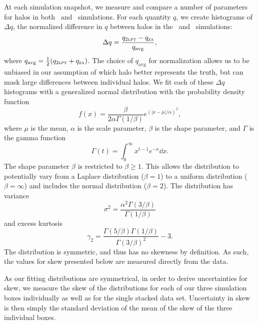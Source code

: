 At each simulation snapshot, we measure and compare a number of parameters for halos in both \lpt\ and \za\ simulations.  For each quantity $q$, we create histograms of $\Delta q$, the normalized difference in $q$ between halos in the \lpt\ and \za\ simulations:
\begin{equation} \label{eq:delta_q}
	\Delta q = \frac{q_{\textsc{2lpt}} - q_{\textsc{za}}}{q_{\mathrm{avg}}},
\end{equation}
where $q_{\mathrm{avg}} = \frac{1}{2} (q_{\textsc{2lpt}} + q_{\textsc{za}})$.  The choice of $q_{\mathrm{avg}}$ for normalization allows us to be unbiased in our assumption of which halo better represents the truth, but can mask large differences between individual halos.  We fit each of these $\Delta q$ histograms with a generalized normal distribution \citep{doi:10.1080/02664760500079464} with the probability density function
\begin{equation} \label{eq:generalized_normal}
	f(x) = \frac{ \beta }{2 \alpha \Gamma(1 / \beta)} e^{\left( \left| x - \mu \right| / \alpha \right)^{\beta}},
\end{equation}
where $\mu$ is the mean, $\alpha$ is the scale parameter, $\beta$ is the shape parameter, and $\Gamma$ is the gamma function
\begin{equation} \label{eq:gamma_function}
	\Gamma(t) = \int_{0}^{\infty} x^{t-1} e^{-x} \dd x.
\end{equation}
The shape parameter $\beta$ is restricted to $\beta \geq 1$.  This allows the distribution to potentially vary from a Laplace distribution ($\beta = 1$) to a uniform distribution ($\beta = \infty$) and includes the normal distribution ($\beta = 2$).  The distribution has variance
\begin{equation} \label{eq:variance}
	\sigma^{2} = \frac{ \alpha^{2} \Gamma(3/\beta) }{ \Gamma(1/\beta) }
\end{equation}
and excess kurtosis
\begin{equation} \label{eq:kurtosis}
	\gamma_{2} = \frac{ \Gamma(5/\beta) \Gamma(1/\beta) }{ \Gamma(3/\beta)^{2} } - 3.
\end{equation}
The distribution is symmetric, and thus has no skewness by definition.  As such, the values for skew presented below are measured directly from the data.

As our fitting distributions are symmetrical, in order to derive uncertainties for skew, we measure the skew of the distributions for each of our three simulation boxes individually as well as for the single stacked data set.  Uncertainty in skew is then simply the standard deviation of the mean of the skew of the three individual boxes.

